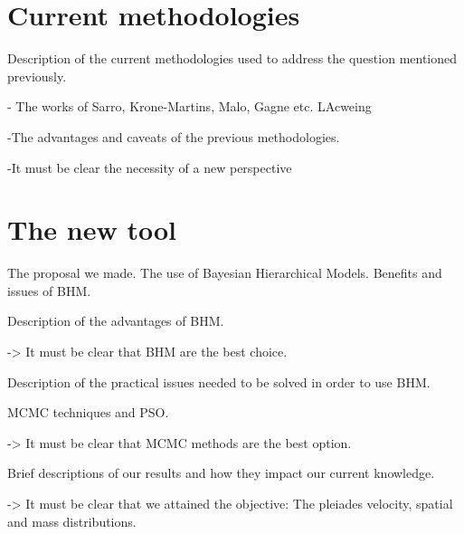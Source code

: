 \section{Current methodologies}
\label{sect:current_methodologies}
Description of the current methodologies used to address the question mentioned previously.

- The works of Sarro, Krone-Martins, Malo, Gagne etc. LAcweing

-The advantages and caveats of the previous methodologies. 

-It must be clear the necessity of a new perspective

\section{The new tool}
\label{sect:newtool}

The proposal we made. The use of Bayesian Hierarchical Models. Benefits and issues of BHM.

Description of the advantages of BHM.

-> It must be clear that BHM are the best choice.

Description of the practical issues needed to be solved in order to use BHM.

MCMC techniques and  PSO.

-> It must be clear that MCMC methods are the best option.

Brief descriptions of our results and how they impact our current knowledge.

-> It must be clear that we attained the objective: The pleiades velocity, spatial and mass distributions.
 



